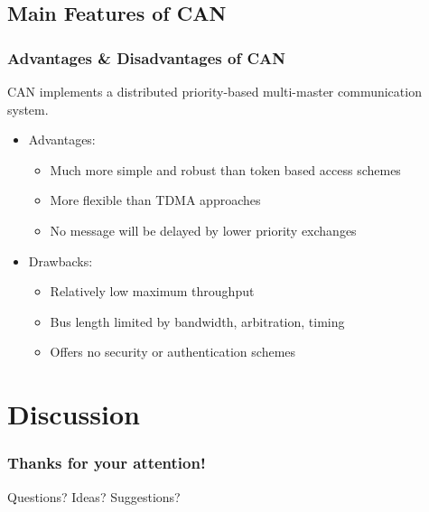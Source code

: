 \documentclass{beamer}
\begin{document}
\subsection{Main Features of CAN}
\begin{frame}
	\frametitle{Advantages \& Disadvantages of CAN}
	CAN implements a distributed priority-based multi-master communication system.
	\vfill
	\begin{itemize}
		\item Advantages:
		\begin{itemize}
			\item Much more simple and robust than token based access schemes
			\item More flexible than TDMA approaches
			\item No message will be delayed by lower priority exchanges
		\end{itemize}
		\item Drawbacks:
		\begin{itemize}
			\item Relatively low maximum throughput
			\item Bus length limited by bandwidth, arbitration, timing
			\item Offers no security or authentication schemes
		\end{itemize}
	\end{itemize}
\end{frame}

\section*{Discussion}
\begin{frame}
	\frametitle{Thanks for your attention!}
	\huge{Questions? Ideas? Suggestions?}
\end{frame}
\end{document}
